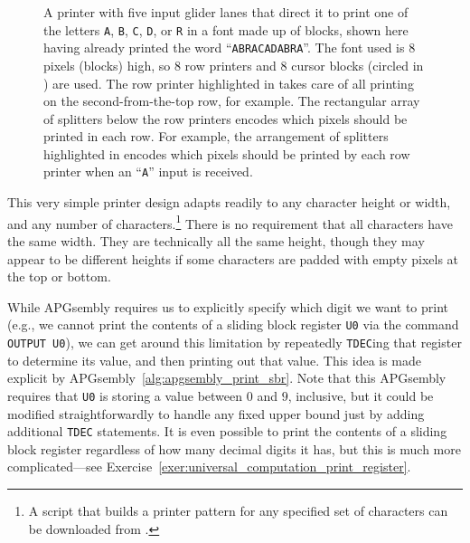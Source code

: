 \begin{figure}[!htb]
	\centering
	\caption{A printer with five input glider lanes that direct it to print one of the letters \texttt{A}, \texttt{B}, \texttt{C}, \texttt{D}, or \texttt{R} in a font made up of blocks, shown here having already printed the word ``\texttt{ABRACADABRA}''. The font used is $8$ pixels (blocks) high, so $8$ row printers and $8$ cursor blocks (circled in ) are used. The row printer highlighted in  takes care of all printing on the second-from-the-top row, for example. The rectangular array of splitters below the row printers encodes which pixels should be printed in each row. For example, the arrangement of splitters highlighted in  encodes which pixels should be printed by each row printer when an ``\texttt{A}'' input is received.}\label{fig:abracadabra_printer}
\end{figure}

This very simple printer design adapts readily to any character height or width, and any number of characters.\footnote{A script that builds a printer pattern for any specified set of characters can be downloaded from .} There is no requirement that all characters have the same width. They are technically all the same height, though they may appear to be different heights if some characters are padded with empty pixels at the top or bottom.

While APGsembly requires us to explicitly specify which digit we want to print (e.g., we cannot print the contents of a sliding block register \texttt{U0} via the command \texttt{OUTPUT U0}), we can get around this limitation by repeatedly \texttt{TDEC}ing that register to determine its value, and then printing out that value. This idea is made explicit by APGsembly~\ref{alg:apgsembly_print_sbr}. Note that this APGsembly requires that \texttt{U0} is storing a value between $0$ and $9$, inclusive, but it could be modified straightforwardly to handle any fixed upper bound just by adding additional \texttt{TDEC} statements. It is even possible to print the contents of a sliding block register regardless of how many decimal digits it has, but this is much more complicated---see Exercise~\ref{exer:universal_computation_print_register}.

